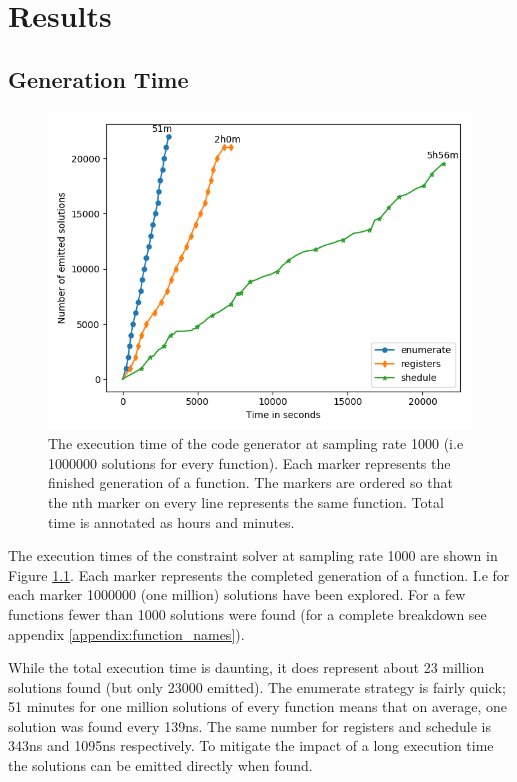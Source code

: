 \chapter{Results}


\section{Generation Time}

\begin{figure}[h]
	\centering
	\includegraphics[width=\textwidth,height=0.5\textheight]{results/figures/generator_time}
	\caption{The execution time of the code generator at sampling rate 1000 (i.e 1000000 solutions for every function). Each marker represents the finished generation of a function. The markers are ordered so that the nth marker on every line represents the same function. Total time is annotated as hours and minutes.}
	\label{fig:time}
\end{figure}

The execution times of the constraint solver at sampling rate 1000 are shown in Figure
\ref{fig:time}. Each marker represents the completed generation of a function. I.e for each
marker 1000000 (one million) solutions have been explored. For a few functions fewer than
1000 solutions were found (for a complete breakdown see appendix \ref{appendix:function_names}).

While the total execution time is daunting, it does represent about 23 million solutions
found (but only 23000 emitted). The enumerate strategy is fairly quick; 51 minutes for one
million solutions of every function means that on average, one solution was found every
139ns. The same number for registers and schedule is 343ns and 1095ns respectively. To
mitigate the impact of a long execution time the solutions can be emitted directly when
found.

